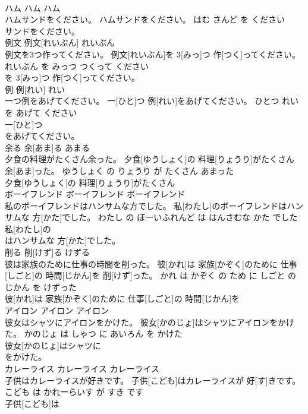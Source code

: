 \documentclass[8pt]{extreport}
\begin{document}
\begin{CJK}{UTF8}{min}
\\	ハム	ハム	ハム	
\\	ハムサンドをください。	ハムサンドをください。	はむ さんど を ください	
\\	サンドをください。			
\\	例文	例文[れいぶん]	れいぶん	
\\	例文を3つ作ってください。	例文[れいぶん]を 3[みっ]つ 作[つく]ってください。	れいぶん を みっつ つくって ください	
\\	を 3[みっ]つ 作[つく]ってください。			
\\	例	例[れい]	れい	
\\	一つ例をあげてください。	一[ひと]つ 例[れい]をあげてください。	ひとつ れい を あげて ください	
\\	一[ひと]つ
\\	をあげてください。			
\\	余る	余[あま]る	あまる	
\\	夕食の料理がたくさん余った。	夕食[ゆうしょく]の 料理[りょうり]がたくさん 余[あま]った。	ゆうしょく の りょうり が たくさん あまった	
\\	夕食[ゆうしょく]の 料理[りょうり]がたくさん
\\	ボーイフレンド	ボーイフレンド	ボーイフレンド	
\\	私のボーイフレンドはハンサムな方でした。	私[わたし]のボーイフレンドはハンサムな 方[かた]でした。	わたし の ぼーいふれんど は はんさむな かた でした	
\\	私[わたし]の
\\	はハンサムな 方[かた]でした。			
\\	削る	削[けず]る	けずる	
\\	彼は家族のために仕事の時間を削った。	彼[かれ]は 家族[かぞく]のために 仕事[しごと]の 時間[じかん]を 削[けず]った。	かれ は かぞく の ため に しごと の じかん を けずった	
\\	彼[かれ]は 家族[かぞく]のために 仕事[しごと]の 時間[じかん]を
\\	アイロン	アイロン	アイロン	
\\	彼女はシャツにアイロンをかけた。	彼女[かのじょ]はシャツにアイロンをかけた。	かのじょ は しゃつ に あいろん を かけた	
\\	彼女[かのじょ]はシャツに
\\	をかけた。			
\\	カレーライス	カレーライス	カレーライス	
\\	子供はカレーライスが好きです。	子供[こども]はカレーライスが 好[す]きです。	こども は かれーらいす が すき です	
\\	子供[こども]は

\end{CJK}
\end{document}
